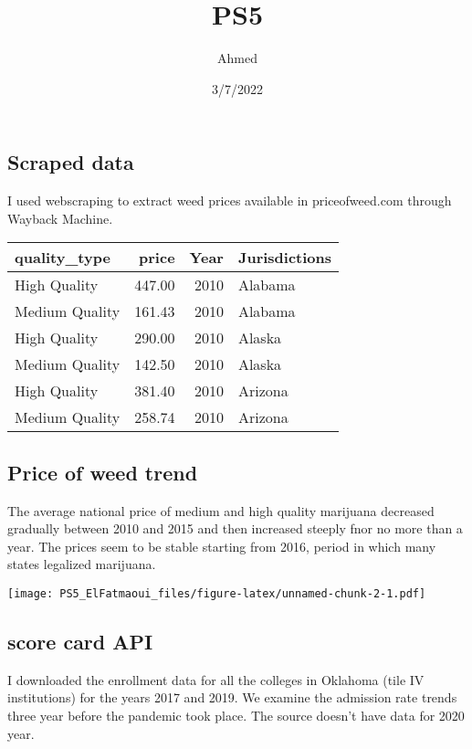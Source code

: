 \documentclass[
]{article}
\title{PS5}
\author{Ahmed}
\date{3/7/2022}
\begin{document}
\maketitle

\hypertarget{scraped-data}{%
\subsection{Scraped data}\label{scraped-data}}

I used webscraping to extract weed prices available in priceofweed.com
through Wayback Machine.

\begin{tabular}{l|r|r|l}
\hline
quality\_type & price & Year & Jurisdictions\\
\hline
High Quality & 447.00 & 2010 & Alabama\\
\hline
Medium Quality & 161.43 & 2010 & Alabama\\
\hline
High Quality & 290.00 & 2010 & Alaska\\
\hline
Medium Quality & 142.50 & 2010 & Alaska\\
\hline
High Quality & 381.40 & 2010 & Arizona\\
\hline
Medium Quality & 258.74 & 2010 & Arizona\\
\hline
\end{tabular}

\hypertarget{price-of-weed-trend}{%
\subsection{Price of weed trend}\label{price-of-weed-trend}}

The average national price of medium and high quality marijuana
decreased gradually between 2010 and 2015 and then increased steeply
fnor no more than a year. The prices seem to be stable starting from
2016, period in which many states legalized marijuana.

\texttt{[image: PS5\_ElFatmaoui\_files/figure-latex/unnamed-chunk-2-1.pdf]}

\hypertarget{score-card-api}{%
\subsection{score card API}\label{score-card-api}}

I downloaded the enrollment data for all the colleges in Oklahoma (tile
IV institutions) for the years 2017 and 2019. We examine the admission
rate trends three year before the pandemic took place. The source
doesn't have data for 2020 year.
\end{document}
